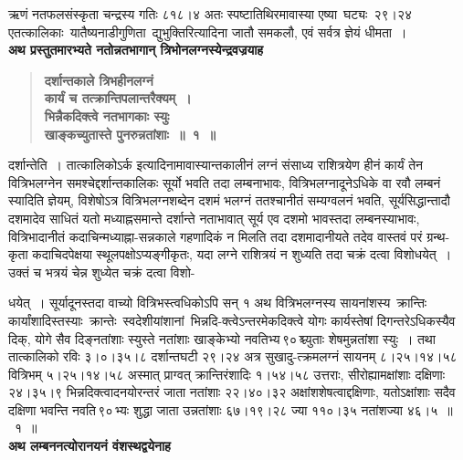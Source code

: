 \documentclass[11pt, openany]{book}
\begin{document}
\newpage

\noindent ऋणं \;नतफलसंस्कृता \;चन्द्रस्य \;गतिः \;८१८।४ \;अतः \;स्पष्टातिथिरमावास्या एष्या \,घट्यः \,२९।२४ \,एतत्कालिकाः \,यातैष्यनाडीगुणिता \,द्युभुक्तिरित्यादिना जातौ समकलौ, एवं सर्वत्र ज्ञेयं धीमता~। \\

{\small \textbf{अथ प्रस्तुतमारभ्यते नतोन्नतभागान् त्रिभोनलग्नस्येन्द्रवज्रयाह\textendash }}

 \label{5.1}
\begin{quote}
{\large \textbf{{\color{purple}दर्शान्तकाले त्रिभहीनलग्नं \\
कार्यं च तत्क्रान्तिपलान्तरैक्यम्~। \\
भिन्नैकदिक्त्वे नतभागकाः स्युः \\
खाङ्कच्युतास्ते पुनरुन्नतांशाः~॥~१~॥}}}
\end{quote}

दर्शान्तेति~। तात्कालिकोऽर्क इत्यादिनामावास्यान्तकालीनं लग्नं संसाध्य राशित्रयेण हीनं कार्यं तेन वित्रिभलग्नेन समश्चेद्दर्शान्तकालिकः सूर्यो भवति तदा \;लम्बनाभावः, \;वित्रिभलग्नादूनेऽधिके \;वा \;रवौ \;लम्बनं \;स्यादिति \;ज्ञेयम्, विशेषोऽत्र वित्रिभलग्नशब्देन दशमं भलग्नं ततश्चानीतं सम्यग्वलनं भवति, सूर्यसिद्धान्तादौ दशमादेव साधितं यतो मध्याह्नसमान्ते दर्शान्ते नताभावात् सूर्य एव दशमो भावस्तदा लम्बनस्याभावः, वित्रिभादानीतं कदाचिन्मध्याह्ना-सन्नकाले गहणादिकं न मिलति तदा दशमादानीयते तदेव वास्तवं परं ग्रन्थ-कृता कदाचिदपेक्षया स्थूलपक्षोऽप्यङ्गीकृतः, यदा लग्ने राशित्रयं न शुध्यति तदा चक्रं दत्वा विशोधयेत्~। उक्तं च भत्रयं चेन्न शुध्येत चक्रं दत्वा विशो-

\newpage

\noindent धयेत्~। सूर्यादूनस्तदा वाच्यो वित्रिभस्त्वधिकोऽपि सन् १ अथ वित्रिभलग्नस्य सायनांशस्य \,क्रान्तिः \,कार्यांशादिस्तस्याः \,क्रान्तेः \,स्वदेशीयांशानां \,भिन्नदि-क्त्वेऽन्तरमेकदिक्त्वे योगः कार्यस्तेषां दिगन्तरेऽधिकस्यैव दिक्, योगे सैव दिङ्नतांशाः स्युस्ते नतांशाः खाङ्केभ्यो नवतिभ्य\textendash \,९०\textendash \,श्च्युताः शेषमुन्नतांशा स्युः~। तथा तात्कालिको रविः ३।०।३५।८ दर्शान्तघटी २९।२४ अत्र सुखादु-त्क्रमलग्नं सायनम् ८।२५।१४।५८ वित्रिभम् ५।२५।१४।५८ अस्मात् प्राग्वत् क्रान्तिरंशादिः \;१।५४।५८ \;उत्तराः, \;सीरोह्यामक्षांशाः \;दक्षिणाः \;२४।३५।९ भिन्नदिक्त्वादनयोरन्तरं जाता नतांशाः २२।४०।३२ अक्षांशशेषत्वाद्दक्षिणाः, यतोऽक्षांशाः सदैव दक्षिणा भवन्ति नवति\textendash \,९०\textendash \,भ्यः शुद्धा जाता उन्नतांशाः ६७।१९।२८ ज्या ११०।३५ नतांशज्या ४६।५~॥~१~॥ \\

{\small \textbf{अथ लम्बननत्योरानयनं वंशस्थद्वयेनाह\textendash }}
\end{document}
